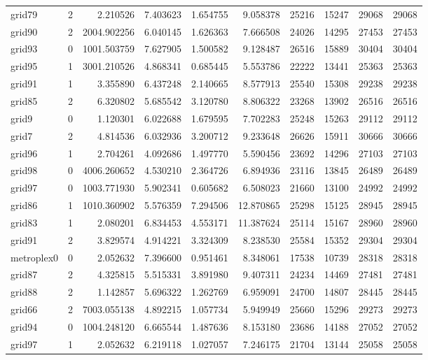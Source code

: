 \begin{longtable}{|l|r|r|r|r|r|r|r|r|r|}
grid79 & 2 & 2.210526 & 7.403623 & 1.654755 & 9.058378 & 25216 & 15247 & 29068 & 29068 \\
grid90 & 2 & 2004.902256 & 6.040145 & 1.626363 & 7.666508 & 24026 & 14295 & 27453 & 27453 \\
grid93 & 0 & 1001.503759 & 7.627905 & 1.500582 & 9.128487 & 26516 & 15889 & 30404 & 30404 \\
grid95 & 1 & 3001.210526 & 4.868341 & 0.685445 & 5.553786 & 22222 & 13441 & 25363 & 25363 \\
grid91 & 1 & 3.355890 & 6.437248 & 2.140665 & 8.577913 & 25540 & 15308 & 29238 & 29238 \\
grid85 & 2 & 6.320802 & 5.685542 & 3.120780 & 8.806322 & 23268 & 13902 & 26516 & 26516 \\
grid9 & 0 & 1.120301 & 6.022688 & 1.679595 & 7.702283 & 25248 & 15263 & 29112 & 29112 \\
grid7 & 2 & 4.814536 & 6.032936 & 3.200712 & 9.233648 & 26626 & 15911 & 30666 & 30666 \\
grid96 & 1 & 2.704261 & 4.092686 & 1.497770 & 5.590456 & 23692 & 14296 & 27103 & 27103 \\
grid98 & 0 & 4006.260652 & 4.530210 & 2.364726 & 6.894936 & 23116 & 13845 & 26489 & 26489 \\
grid97 & 0 & 1003.771930 & 5.902341 & 0.605682 & 6.508023 & 21660 & 13100 & 24992 & 24992 \\
grid86 & 1 & 1010.360902 & 5.576359 & 7.294506 & 12.870865 & 25298 & 15125 & 28945 & 28945 \\
grid83 & 1 & 2.080201 & 6.834453 & 4.553171 & 11.387624 & 25114 & 15167 & 28960 & 28960 \\
grid91 & 2 & 3.829574 & 4.914221 & 3.324309 & 8.238530 & 25584 & 15352 & 29304 & 29304 \\
metroplex0 & 0 & 2.052632 & 7.396600 & 0.951461 & 8.348061 & 17538 & 10739 & 28318 & 28318 \\
grid87 & 2 & 4.325815 & 5.515331 & 3.891980 & 9.407311 & 24234 & 14469 & 27481 & 27481 \\
grid88 & 2 & 1.142857 & 5.696322 & 1.262769 & 6.959091 & 24700 & 14807 & 28445 & 28445 \\
grid66 & 2 & 7003.055138 & 4.892215 & 1.057734 & 5.949949 & 25660 & 15296 & 29273 & 29273 \\
grid94 & 0 & 1004.248120 & 6.665544 & 1.487636 & 8.153180 & 23686 & 14188 & 27052 & 27052 \\
grid97 & 1 & 2.052632 & 6.219118 & 1.027057 & 7.246175 & 21704 & 13144 & 25058 & 25058 \\

\end{longtable}
